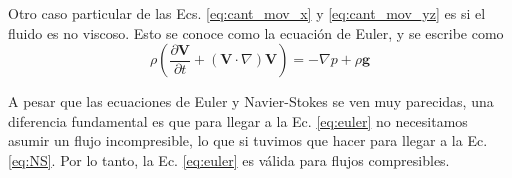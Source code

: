 Otro caso particular de las Ecs. \eqref{eq:cant_mov_x} y \eqref{eq:cant_mov_yz} es si el fluido es no viscoso.
Esto se conoce como la ecuación de Euler, y se escribe como
%
\begin{equation}\label{eq:euler}
\rho\left(\frac{\partial \mathbf{V}}{\partial t} + (\mathbf{V}\cdot\nabla)\mathbf{V} \right) = -\nabla p + \rho \mathbf{g} 
\end{equation}

A pesar que las ecuaciones de Euler y Navier-Stokes se ven muy parecidas, una diferencia fundamental es que para llegar a la Ec. \eqref{eq:euler} no necesitamos asumir un flujo incompresible, lo que si tuvimos que hacer para llegar a la Ec. \eqref{eq:NS}.
Por lo tanto, la Ec. \eqref{eq:euler} es válida para flujos compresibles.
